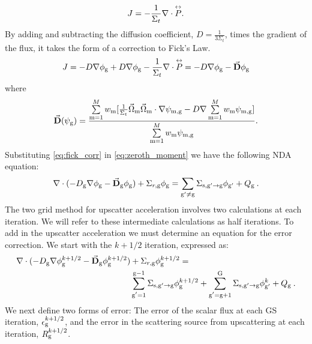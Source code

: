   \begin{equation}
  J= -\frac{1}{\Sigma_t} \nabla \cdot \overset{\text{\scriptsize$\leftrightarrow$}}{P}. 
  \end{equation}
  By adding and subtracting the diffusion coefficient, $D = \frac{1}{3\Sigma_t}$, times the gradient of the flux, it takes the form of a correction to Fick's Law. 
  \begin{equation}
  J = -D \nabla \phi_{\mathrm{g}} + D \nabla \phi_{\mathrm{g}} - \frac{1}{\Sigma_t} \nabla \cdot \overset{\text{\scriptsize$\leftrightarrow$}}{P} \\
  = -D \nabla \phi_{\mathrm{g}} - \vec{\textbf{D}} \phi_{\mathrm{g}}
  \label{eq:fick_corr}
  \end{equation}
  where 
 \begin{equation}
  \vec{\textbf{D}} (\psi_{\mathrm{g}}) = \frac{\sum\limits_{\mathrm{m}=1}^M w_{\mathrm{m}} [\frac{1}{\Sigma_t} \vec{\Omega}_{\mathrm{m}} \vec{\Omega}_{\mathrm{m}} \cdot \nabla\psi_{\mathrm{m}, \mathrm{g}} - D \nabla \sum\limits_{\mathrm{m}=1}^M w_{\mathrm{m}}\psi_{\mathrm{m}, \mathrm{g}}]}{\sum\limits_{\mathrm{m}=1}^M w_{\mathrm{m}} \psi_{\mathrm{m}, \mathrm{g}}}.
  \end{equation} 
 Substituting \eqref{eq:fick_corr} in \eqref{eq:zeroth_moment} we have the following NDA equation:
  \begin{equation}
  \nabla\cdot(-D_{\mathrm{g}} \nabla \phi_{\mathrm{g}} - \vec{\bf D}_{\mathrm{g}} \phi_{\mathrm{g}}) + \Sigma_{r,\mathrm{g}} \phi_{\mathrm{g}} = \sum\limits_{{\mathrm{g}'}\neq\mathrm{g}}\Sigma_{\mathrm{s},\mathrm{g}' \rightarrow \mathrm{g}}\phi_{\mathrm{g}'} + Q_{\mathrm{g}} \:. \label{eq:NDA}
  \end{equation}
  The two grid method for upscatter acceleration involves two calculations at each iteration. We will refer to these intermediate calculations as half iterations. To add in the upscatter acceleration we must determine an equation for the error correction. We start with the $k + 1/2$ iteration, expressed as:
  \begin{equation}
  \begin{split}
  \nabla\cdot(-D_{\mathrm{g}} \nabla \phi_{\mathrm{g}}^{k+1/2} - \vec{\bf D}_{\mathrm{g}} \phi_{\mathrm{g}}^{k+1/2}) &+ \Sigma_{r,\mathrm{g}} \phi_{\mathrm{g}}^{k+1/2} =  \\ &\sum\limits_{\substack{\mathrm{g}'=1}}^{\mathrm{g-1}} \Sigma_{\mathrm{s},\mathrm{g}' \to\mathrm{g}}\phi_{\mathrm{g}}^{k+1/2} + \sum\limits_{\substack{\mathrm{g}'=\mathrm{g}+1}}^{\mathrm{G}} \Sigma_{\mathrm{s},\mathrm{g}' \to\mathrm{g}}\phi_{\mathrm{g}'}^{k} + Q_{\mathrm{g}}\:. 
  \end{split}
  \label{eq:k1/2}
  \end{equation}
  We next define two forms of error: The error of the scalar flux at each GS iteration, $\epsilon_{\mathrm{g}}^{k+1/2}$, and the error in the scattering source from upscattering at each iteration, $R_{\mathrm{g}}^{k+1/2}$.
